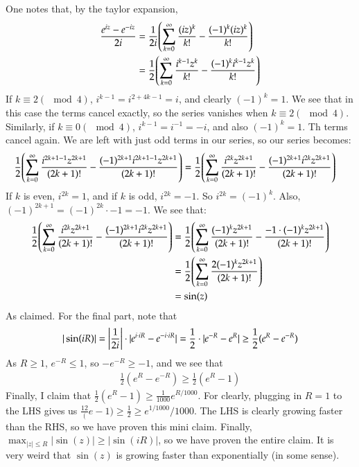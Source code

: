\documentclass[12pt]{article}
\theoremstyle{definition}
\theoremstyle{remark}
\begin{document}
\begin{enumerate}[leftmargin=\labelsep]
		One notes that, by the taylor expansion,
		\begin{align*}
			\frac{e^{iz}-e^{-iz}}{2i} &= \frac1{2i} \qty(\sum_{k=0}^\infty \frac{(iz)^k}{k!} - \frac{(-1)^k (iz)^k}{k!}) \\
			&= \frac 12 \qty(\sum_{k=0}^\infty \frac{i^{k-1}z^k}{k!} - \frac{(-1)^k i^{k-1}z^k}{k!})
		\end{align*}
		If $k \equiv 2 (\mod 4)$, $i^{k-1} = i^{2+4k-1} = i$, and clearly $(-1)^k = 1$. We see that in this case the terms cancel exactly, so the series vanishes when $k \equiv 2 (\mod 4)$. Similarly, if $k \equiv 0 (\mod 4)$, $i^{k-1} = i^{-1} = -i$, and also $(-1)^k = 1$. Th terms cancel again. We are left with just odd terms in our series, so our series becomes:
		\begin{align*}
			\frac 12 \qty(\sum_{k=0}^\infty \frac{i^{2k+1-1}z^{2k+1}}{(2k+1)!} - \frac{(-1)^{2k+1} i^{2k+1-1}z^{2k+1}}{(2k+1)!}) &= \frac 12 \qty(\sum_{k=0}^\infty \frac{i^{2k}z^{2k+1}}{(2k+1)!} - \frac{(-1)^{2k+1} i^{2k}z^{2k+1}}{(2k+1)!})
		\end{align*}
		If $k$ is even, $i^{2k} = 1$, and if $k$ is odd, $i^{2k} = -1$. So $i^{2k} = (-1)^k$. Also, $(-1)^{2k+1} = (-1)^{2k} \cdot -1 = -1$. We see that:
		\begin{align*}
			\frac 12 \qty(\sum_{k=0}^\infty \frac{i^{2k}z^{2k+1}}{(2k+1)!} - \frac{(-1)^{2k+1} i^{2k}z^{2k+1}}{(2k+1)!}) &= \frac 12 \qty(\sum_{k=0}^\infty \frac{(-1)^k z^{2k+1}}{(2k+1)!} - \frac{-1 \cdot (-1)^k z^{2k+1}}{(2k+1)!}) \\
			&= \frac 12 \qty(\sum_{k=0}^\infty \frac{2(-1)^k z^{2k+1}}{(2k+1)!}) \\
			&= \sin(z)
		\end{align*}
		As claimed. For the final part, note that
		\begin{align*}
			|\sin(iR)| = \qty|\frac1{2i}| \cdot |e^{i \cdot iR} - e^{-i \cdot iR}| = \frac12 \cdot |e^{-R} - e^R| \geq \frac12 (e^R - e^{-R})
		\end{align*}
		As $R \geq 1$, $e^{-R} \leq 1$, so $-e^{-R} \geq -1$, and we see that
		\begin{align*}
			\frac12 (e^R - e^{-R}) \geq \frac 12 (e^R - 1)
		\end{align*}
		Finally, I claim that $\frac12 (e^R - 1) \geq \frac1{1000} e^{R/1000}$. For clearly, plugging in $R = 1$ to the LHS gives us $\frac{12}(e - 1) \geq \frac12 \geq e^{1/1000}/1000$. The LHS is clearly growing faster than the RHS, so we have proven this mini claim. Finally, $\max_{|z| \leq R} |\sin(z)| \geq |\sin(iR)|$, so we have proven the entire claim. It is very weird that $\sin(z)$ is growing faster than exponentially (in some sense).
	

\end{enumerate}
\end{document}
